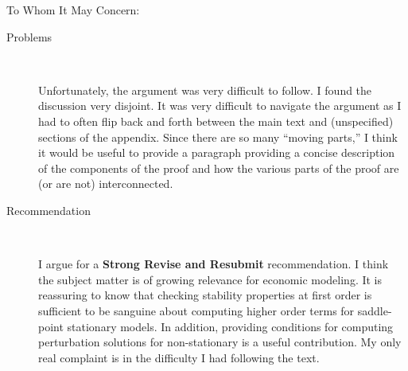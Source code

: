 \documentclass{article}
\begin{document}
\begin{letter}{To Whom It May Concern:}
\begin{description}
\item[Problems] \ 

Unfortunately, the argument was very difficult to follow. I found the discussion
very disjoint.  It was very difficult to navigate the argument as I had to
often flip back and forth between the main text and (unspecified) sections
of the appendix. 
Since there are so many ``moving parts,'' I think
 it would be useful to provide a paragraph
providing a  concise description of the components of the proof and  how the
various  parts of the proof are (or are not) interconnected.

\item[Recommendation] \ 

I argue for a {\bf Strong Revise and Resubmit} recommendation.  I think the
subject matter is of growing relevance for economic modeling.  It is reassuring
to know that checking stability properties at first order is
sufficient to be sanguine about computing higher order terms for saddle-point
stationary models.  
In addition, providing conditions for computing perturbation solutions
for non-stationary is a useful contribution. My only real complaint is in the
difficulty I had following the text.

\end{description}



\end{letter}
\end{document}
